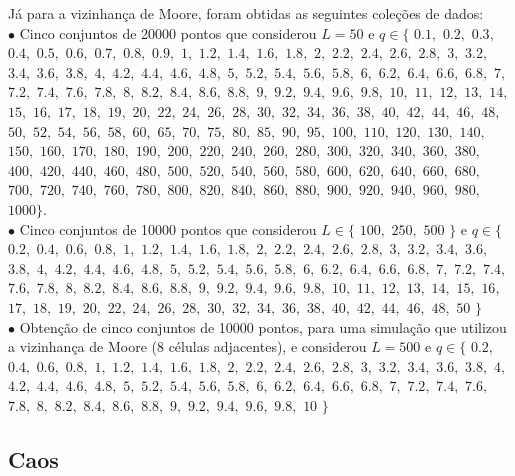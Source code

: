 \documentclass[
	12pt,				%
	openright,			%
	twoside,			%
	a4paper,			%
	english,			%
	french,				%
	spanish,			%
	brazil				%
	]{abntex2}
\begin{document}
	Já para a vizinhança de Moore, foram obtidas as seguintes coleções de dados:\\
	$\bullet$ Cinco conjuntos de 20000 pontos que considerou $L=50$ e $q\in\{$ 
  $0.1,$ $0.2,$ $0.3,$ $0.4,$ $0.5,$ $0.6,$ $0.7,$ $0.8,$ $0.9,$
  $1,$ $1.2,$ $1.4,$ $1.6,$ $1.8,$ 
  $2,$ $2.2,$ $2.4,$ $2.6,$ $2.8,$ 
  $3,$ $3.2,$ $3.4,$ $3.6,$ $3.8,$
  $4,$ $4.2,$ $4.4,$ $4.6,$ $4.8,$
  $5,$ $5.2,$ $5.4,$ $5.6,$ $5.8,$
  $6,$ $6.2,$ $6.4,$ $6.6,$ $6.8,$
  $7,$ $7.2,$ $7.4,$ $7.6,$ $7.8,$
  $8,$ $8.2,$ $8.4,$ $8.6,$ $8.8,$
  $9,$ $9.2,$ $9.4,$ $9.6,$ $9.8,$ $10,$
  $11,$ $12,$ $13,$ $14,$ $15,$ $16,$ $17,$ $18,$ $19,$ $20,$
  $22,$ $24,$ $26,$ $28,$ $30,$ $32,$ $34,$ $36,$ $38,$ $40,$
  $42,$ $44,$ $46,$ $48,$ $50,$ $52,$ $54,$ $56,$ $58,$ $60,$
  $65,$ $70,$ $75,$ $80,$ $85,$ $90,$ $95,$ $100,$ $110,$
  $120,$ $130,$ $140,$ $150,$ $160,$ $170,$ $180,$ $190,$
  $200,$ $220,$ $240,$ $260,$ $280,$ $300,$ $320,$ $340,$ $360,$ $380,$
  $400,$ $420,$ $440,$ $460,$ $480,$ $500,$ $520,$ $540,$ $560,$ $580,$
  $600,$ $620,$ $640,$ $660,$ $680,$ $700,$ $720,$ $740,$ $760,$ $780,$
  $800,$ $820,$ $840,$ $860,$ $880,$ $900,$ $920,$ $940,$ $960,$ $980,$
  $1000\}$. \\
	$\bullet$ Cinco conjuntos de 10000 pontos que considerou $L\in\{$ $100,$ $250,$ $500$ $\}$  e $q\in\{$ 
  $0.2,$ $0.4,$ $0.6,$ $0.8,$
  $1,$ $1.2,$ $1.4,$ $1.6,$ $1.8,$ 
  $2,$ $2.2,$ $2.4,$ $2.6,$ $2.8,$ 
  $3,$ $3.2,$ $3.4,$ $3.6,$ $3.8,$
  $4,$ $4.2,$ $4.4,$ $4.6,$ $4.8,$
  $5,$ $5.2,$ $5.4,$ $5.6,$ $5.8,$
  $6,$ $6.2,$ $6.4,$ $6.6,$ $6.8,$
  $7,$ $7.2,$ $7.4,$ $7.6,$ $7.8,$
  $8,$ $8.2,$ $8.4,$ $8.6,$ $8.8,$
  $9,$ $9.2,$ $9.4,$ $9.6,$ $9.8,$ $10,$
  $11,$ $12,$ $13,$ $14,$ $15,$ $16,$ $17,$ $18,$ $19,$ $20,$
  $22,$ $24,$ $26,$ $28,$ $30,$ $32,$ $34,$ $36,$ $38,$ $40,$
	$42,$ $44,$ $46,$ $48,$ $50$ $\}$\\
	$\bullet$ Obtenção de cinco conjuntos de 10000 pontos, para uma simulação que utilizou a vizinhança de Moore (8 células adjacentes), e considerou $L=500$  e $q\in\{$ 
  $0.2,$ $0.4,$ $0.6,$ $0.8,$
  $1,$ $1.2,$ $1.4,$ $1.6,$ $1.8,$ 
  $2,$ $2.2,$ $2.4,$ $2.6,$ $2.8,$ 
  $3,$ $3.2,$ $3.4,$ $3.6,$ $3.8,$
  $4,$ $4.2,$ $4.4,$ $4.6,$ $4.8,$
  $5,$ $5.2,$ $5.4,$ $5.6,$ $5.8,$
  $6,$ $6.2,$ $6.4,$ $6.6,$ $6.8,$
  $7,$ $7.2,$ $7.4,$ $7.6,$ $7.8,$
  $8,$ $8.2,$ $8.4,$ $8.6,$ $8.8,$
  $9,$ $9.2,$ $9.4,$ $9.6,$ $9.8,$ $10$ $\}$
\subsection{Caos}
\end{document}
